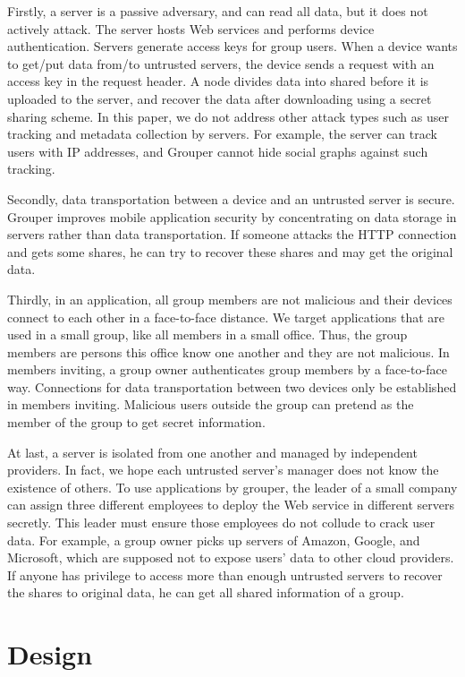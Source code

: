 \documentclass[twocolumn,10pt]{article}
\begin{document}
Firstly, a server is a passive adversary, and can read all data, but it does not actively attack.
The server hosts Web services and performs device authentication.
Servers generate access keys for group users. 
When a device wants to get/put data from/to untrusted servers, the device sends a request with an access key in the request header.
A node divides data into shared before it is uploaded to the server, and recover the data after downloading using a secret sharing scheme. 
In this paper, we do not address other attack types such as user tracking and metadata collection by servers. 
For example, the server can track users with IP addresses, and Grouper cannot hide social graphs against such tracking.

Secondly, data transportation between a device and an untrusted server is secure.
Grouper improves mobile application security by concentrating on data storage in servers rather than data transportation.
If someone attacks the HTTP connection and gets some shares, he can try to recover these shares and may get the original data.

Thirdly, in an application, all group members are not malicious and their devices connect to each other in a face-to-face distance.
We target applications that are used in a small group, like all members in a small office.
Thus, the group members are persons this office know one another and they are not malicious.
In members inviting, a group owner authenticates group members by a face-to-face way.
Connections for data transportation between two devices only be established in members inviting.
Malicious users outside the group can pretend as the member of the group to get secret information.

At last, a server is isolated from one another and managed by independent providers.
In fact, we hope each untrusted server’s manager does not know the existence of others.
To use applications by grouper, the leader of a small company can assign three different employees to deploy the Web service in different servers secretly. 
This leader must ensure those employees do not collude to crack user data.
For example, a group owner picks up servers of Amazon, Google, and Microsoft, which are supposed not to expose users' data to other cloud providers.
If anyone has privilege to access more than enough untrusted servers to recover the shares to original data, he can get all shared information of a group.

\section{Design}
\end{document}
